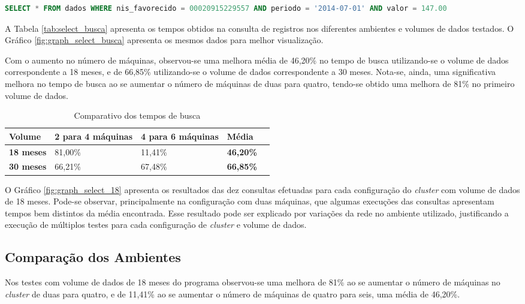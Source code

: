 \begin{lstlisting}[caption={Consulta CQL},label={lst:cql_select},language=SQL]
SELECT * FROM dados WHERE nis_favorecido = 00020915229557 AND periodo = '2014-07-01' AND valor = 147.00 
\end{lstlisting}

A Tabela \ref{tab:select_busca} apresenta os tempos obtidos na consulta de registros nos diferentes ambientes e volumes de dados testados. O Gráfico \ref{fig:graph_select_busca} apresenta os mesmos dados para melhor visualização.

Com o aumento no número de máquinas, observou-se uma melhora média de 46,20\% no tempo de busca utilizando-se o volume de dados correspondente a 18 meses, e de 66,85\% utilizando-se o volume de dados correspondente a 30 meses. Nota-se, ainda, uma significativa melhora no tempo de busca ao se aumentar o número de máquinas de duas para quatro, tendo-se obtido uma melhora de 81\% no primeiro volume de dados.

\begin{table}[]
	\centering
	\caption{Comparativo dos tempos de busca}
	\label{tb:comparativo_select}
	\begin{tabular}{lllll}
		\textbf{Volume} 	& \textbf{2 para 4 máquinas} & \textbf{4 para 6 máquinas}  & \textbf{Média}   &  \\ \hline
		\textbf{18 meses} 	& 81,00\%                    & 11,41\%                     & \textbf{46,20\%} &  \\ \hline
		\textbf{30 meses}	& 66,21\%                    & 67,48\%                     & \textbf{66,85\%} &  \\ \hline
	\end{tabular}
\end{table}

O Gráfico \ref{fig:graph_select_18} apresenta os resultados das dez consultas efetuadas para cada configuração do \emph{cluster} com volume de dados de 18 meses. Pode-se observar, principalmente na configuração com duas máquinas, que algumas execuções das consultas apresentam tempos bem distintos da média encontrada. Esse resultado pode ser explicado por variações da rede no ambiente utilizado, justificando a execução de múltiplos testes para cada configuração de \emph{cluster} e volume de dados. 


\subsection{Comparação dos Ambientes}
Nos testes com volume de dados de 18 meses do programa observou-se uma melhora de 81\% ao se aumentar o número de máquinas no \emph{cluster} de duas para quatro, e de 11,41\% ao se aumentar o número de máquinas de quatro para seis, uma média de 46,20\%. 

